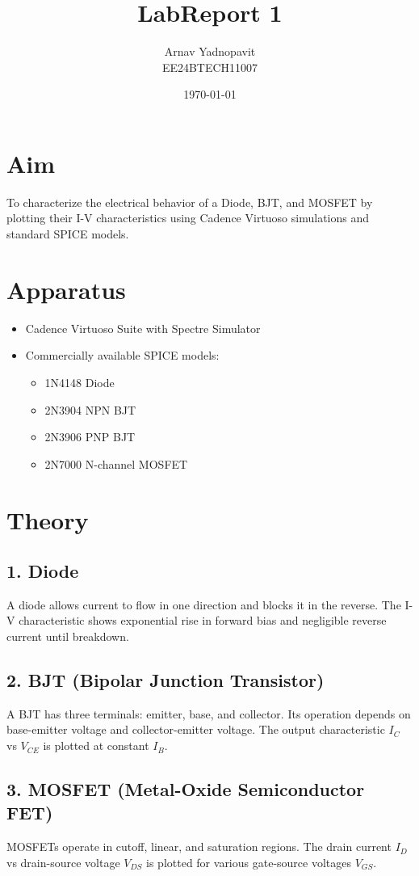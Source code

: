\documentclass[12pt,a4paper]{article}
\title{LabReport 1}
\author{Arnav Yadnopavit\\EE24BTECH11007}
\date{\today}
\begin{document}
\maketitle

\section*{Aim}
To characterize the electrical behavior of a Diode, BJT, and MOSFET by plotting their I-V characteristics using Cadence Virtuoso simulations and standard SPICE models.

\section*{Apparatus}
\begin{itemize}
    \item Cadence Virtuoso Suite with Spectre Simulator
    \item Commercially available SPICE models:
    \begin{itemize}
        \item 1N4148 Diode
        \item 2N3904 NPN BJT
        \item 2N3906 PNP BJT
        \item 2N7000 N-channel MOSFET
    \end{itemize}
\end{itemize}

\section*{Theory}
\subsection*{1. Diode}
A diode allows current to flow in one direction and blocks it in the reverse. The I-V characteristic shows exponential rise in forward bias and negligible reverse current until breakdown.

\subsection*{2. BJT (Bipolar Junction Transistor)}
A BJT has three terminals: emitter, base, and collector. Its operation depends on base-emitter voltage and collector-emitter voltage. The output characteristic \( I_C \) vs \( V_{CE} \) is plotted at constant \( I_B \).

\subsection*{3. MOSFET (Metal-Oxide Semiconductor FET)}
MOSFETs operate in cutoff, linear, and saturation regions. The drain current \( I_D \) vs drain-source voltage \( V_{DS} \) is plotted for various gate-source voltages \( V_{GS} \).
\end{document}
